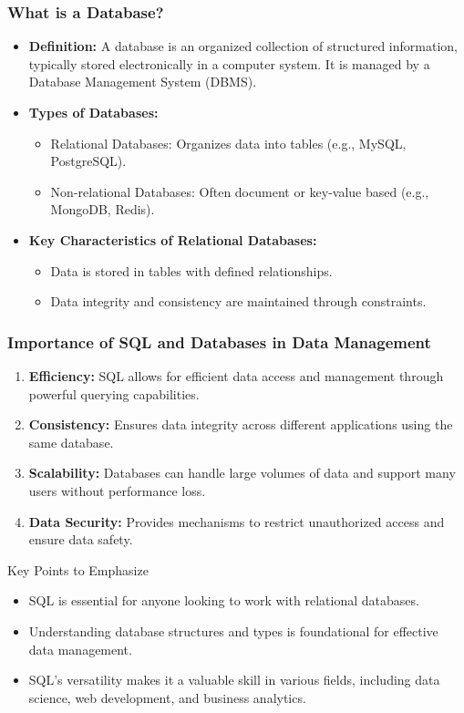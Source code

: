 \documentclass[aspectratio=169]{beamer}
\begin{document}
\begin{frame}[fragile]
    \frametitle{What is a Database?}
    \begin{itemize}
        \item \textbf{Definition:} A database is an organized collection of structured information, typically stored electronically in a computer system. It is managed by a Database Management System (DBMS).
        
        \item \textbf{Types of Databases:}
        \begin{itemize}
            \item Relational Databases: Organizes data into tables (e.g., MySQL, PostgreSQL).
            \item Non-relational Databases: Often document or key-value based (e.g., MongoDB, Redis).
        \end{itemize}
        
        \item \textbf{Key Characteristics of Relational Databases:}
        \begin{itemize}
            \item Data is stored in tables with defined relationships.
            \item Data integrity and consistency are maintained through constraints.
        \end{itemize}
    \end{itemize}
\end{frame}

\begin{frame}[fragile]
    \frametitle{Importance of SQL and Databases in Data Management}
    \begin{enumerate}
        \item \textbf{Efficiency:} SQL allows for efficient data access and management through powerful querying capabilities.
        \item \textbf{Consistency:} Ensures data integrity across different applications using the same database.
        \item \textbf{Scalability:} Databases can handle large volumes of data and support many users without performance loss.
        \item \textbf{Data Security:} Provides mechanisms to restrict unauthorized access and ensure data safety.
    \end{enumerate}
    
    \begin{block}{Key Points to Emphasize}
        \begin{itemize}
            \item SQL is essential for anyone looking to work with relational databases.
            \item Understanding database structures and types is foundational for effective data management.
            \item SQL's versatility makes it a valuable skill in various fields, including data science, web development, and business analytics.
        \end{itemize}
    \end{block}
\end{frame}
\end{document}
